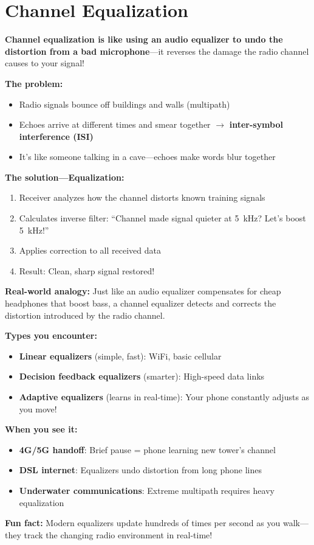 \chapter{Channel Equalization}
\label{ch:channel-equalization}

\begin{nontechnical}
\textbf{Channel equalization is like using an audio equalizer to undo the distortion from a bad microphone}---it reverses the damage the radio channel causes to your signal!

\textbf{The problem:}
\begin{itemize}
\item Radio signals bounce off buildings and walls (multipath)
\item Echoes arrive at different times and smear together $\rightarrow$ \textbf{inter-symbol interference (ISI)}
\item It's like someone talking in a cave---echoes make words blur together
\end{itemize}

\textbf{The solution---Equalization:}
\begin{enumerate}
\item Receiver analyzes how the channel distorts known training signals
\item Calculates inverse filter: ``Channel made signal quieter at 5~kHz? Let's boost 5~kHz!''
\item Applies correction to all received data
\item Result: Clean, sharp signal restored!
\end{enumerate}

\textbf{Real-world analogy:} Just like an audio equalizer compensates for cheap headphones that boost bass, a channel equalizer detects and corrects the distortion introduced by the radio channel.

\textbf{Types you encounter:}
\begin{itemize}
\item \textbf{Linear equalizers} (simple, fast): WiFi, basic cellular
\item \textbf{Decision feedback equalizers} (smarter): High-speed data links
\item \textbf{Adaptive equalizers} (learns in real-time): Your phone constantly adjusts as you move!
\end{itemize}

\textbf{When you see it:}
\begin{itemize}
\item \textbf{4G/5G handoff}: Brief pause = phone learning new tower's channel
\item \textbf{DSL internet}: Equalizers undo distortion from long phone lines
\item \textbf{Underwater communications}: Extreme multipath requires heavy equalization
\end{itemize}

\textbf{Fun fact:} Modern equalizers update hundreds of times per second as you walk---they track the changing radio environment in real-time!
\end{nontechnical}

